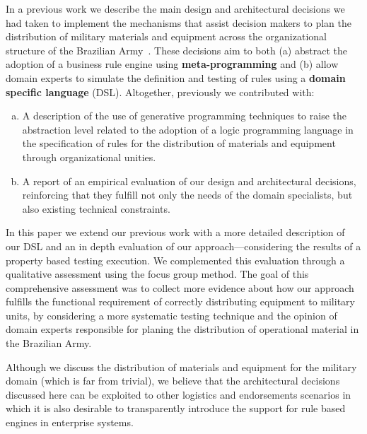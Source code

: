 In a previous work we describe the main design and architectural decisions we had taken to implement the mechanisms that assist decision makers to plan the distribution of military materials and equipment across the organizational structure of the Brazilian Army~\cite{phtcosta:sbcars}. These decisions aim to both (a) abstract the adoption of a business rule engine using {\bf meta-programming} and (b) allow domain experts to simulate the definition and testing of rules using a {\bf domain specific language} (DSL). Altogether, previously we contributed with:

\begin{enumerate}[(a)] 

\item A description of the use of generative programming techniques to raise the abstraction level related to the adoption of a logic programming language in the specification of rules for the 	distribution of materials and equipment through organizational unities.

\item A report of an empirical evaluation of our design and architectural decisions, reinforcing that they fulfill not only the needs of the domain specialists, but also existing technical constraints. 	

\end{enumerate}


In this paper we extend our previous work with a more detailed description of our DSL and an in depth evaluation of our approach---considering the results of a property based testing execution. We complemented this evaluation through a qualitative assessment using the focus group method. The goal of this comprehensive assessment was to collect more evidence about how our approach fulfills the functional requirement of correctly distributing equipment to military units, by considering a more systematic testing technique and the opinion of domain experts responsible for planing the distribution of operational material in the Brazilian Army. 

Although we discuss the distribution of materials and equipment for the military domain (which is far from trivial), we believe that the architectural decisions discussed here can be exploited to other logistics and endorsements scenarios in which it is also desirable to transparently introduce the support for rule based engines in enterprise systems.

